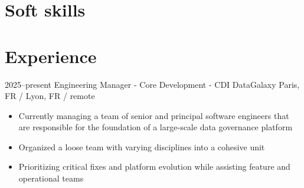 \documentclass[11pt,a4paper,sans]{moderncv}
\begin{document}
  \section{Soft skills}
  \begin{cvcolumns}
  \end{cvcolumns}
  \pagebreak

  \section{Experience}

  \cventry
    {2025--present}
    {Engineering Manager - Core Development - CDI}
    {DataGalaxy}
    {Paris, FR / Lyon, FR / remote}
    {}
    {
      \begin{itemize}
        \item Currently managing a team of senior and principal software engineers that are responsible for the foundation of a large-scale data governance platform
        \item Organized a loose team with varying disciplines into a cohesive unit
        \item Prioritizing critical fixes and platform evolution while assisting feature and operational teams
      \end{itemize}
    }
\end{document}
